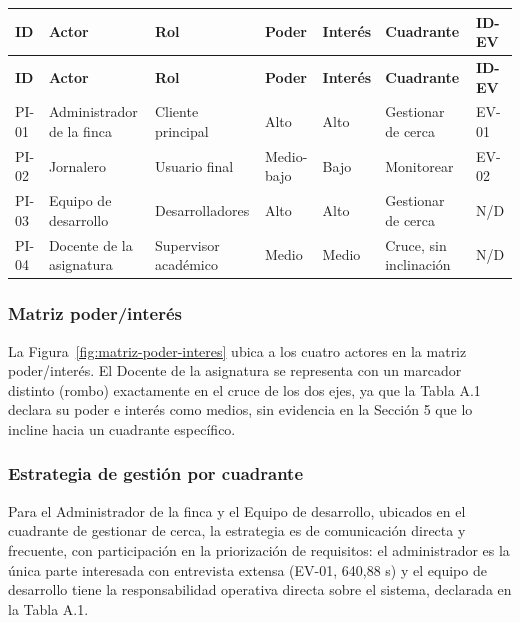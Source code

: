 \documentclass[12pt,a4paper]{article}
\begin{document}
\begin{center}
\begin{longtable}{|p{1.1cm}|p{2.7cm}|p{2.8cm}|p{1.3cm}|p{1.3cm}|p{2.1cm}|p{1.1cm}|}
\hline
\textbf{ID} & \textbf{Actor} & \textbf{Rol} & \textbf{Poder} & \textbf{Interés} & \textbf{Cuadrante} & \textbf{ID-EV} \\
\hline
\endfirsthead
\hline
\textbf{ID} & \textbf{Actor} & \textbf{Rol} & \textbf{Poder} & \textbf{Interés} & \textbf{Cuadrante} & \textbf{ID-EV} \\
\hline
\endhead
\hline
\endfoot
\hline
\endlastfoot
PI-01 & Administrador de la finca & Cliente principal & Alto & Alto & Gestionar de cerca & EV-01 \\
\hline
PI-02 & Jornalero & Usuario final & Medio-bajo & Bajo & Monitorear & EV-02 \\
\hline
PI-03 & Equipo de desarrollo & Desarrolladores & Alto & Alto & Gestionar de cerca & N/D \\
\hline
PI-04 & Docente de la asignatura & Supervisor académico & Medio & Medio & Cruce, sin inclinación & N/D \\
\hline
\end{longtable}
\label{tab:identificacion-stakeholders}
\end{center}

\subsubsection{Matriz poder/interés}
\label{sec:matriz-poder-interes-texto}

La Figura~\ref{fig:matriz-poder-interes} ubica a los cuatro actores en la matriz poder/interés. El Docente de la asignatura se representa con un marcador distinto (rombo) exactamente en el cruce de los dos ejes, ya que la Tabla A.1 declara su poder e interés como medios, sin evidencia en la Sección 5 que lo incline hacia un cuadrante específico.

\subsubsection{Estrategia de gestión por cuadrante}
\label{sec:estrategia-cuadrante}

Para el Administrador de la finca y el Equipo de desarrollo, ubicados en el cuadrante de gestionar de cerca, la estrategia es de comunicación directa y frecuente, con participación en la priorización de requisitos: el administrador es la única parte interesada con entrevista extensa (EV-01, 640,88 s) y el equipo de desarrollo tiene la responsabilidad operativa directa sobre el sistema, declarada en la Tabla A.1.
\end{document}
